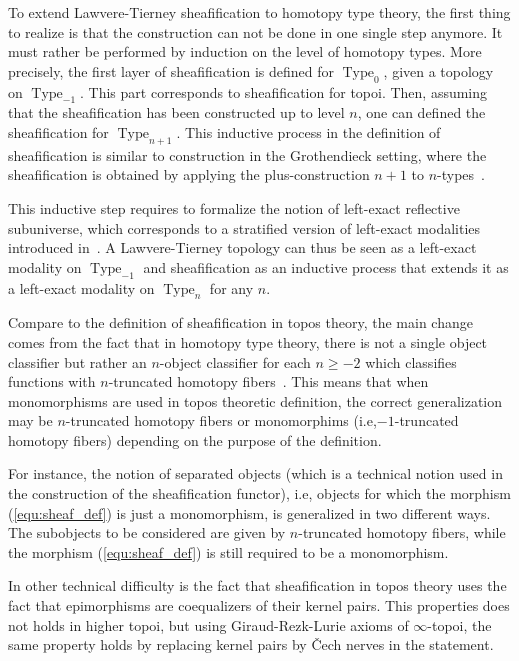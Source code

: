 \documentclass[conference]{IEEEtran}
\newcommand{\ie}{i.e,\xspace}
\DeclareMathOperator{\Type}{Type}
\begin{document}
To extend Lawvere-Tierney sheafification to homotopy type theory, the
first thing to realize is that the construction can not be done in one
single step anymore. It must rather be performed by induction on the
level of homotopy types. More precisely, the first layer of
sheafification is defined for $\Type_{0}$, given a topology on
$\Type_{-1}$. This part corresponds to sheafification for topoi. Then,
assuming that the sheafification has been constructed up to level $n$,
one can defined the sheafification for $\Type_{n+1}$.
%
This inductive process in the definition of sheafification is similar
to construction in the Grothendieck setting, where the
sheafification is obtained by applying the plus-construction $n+1$ to
$n$-types~\cite[Chapter~6]{lurie}.

This inductive step requires to formalize the notion of left-exact
reflective subuniverse, which corresponds to a stratified version of
left-exact modalities introduced in~\cite[Chapter~7]{hottbook}. A
Lawvere-Tierney topology can thus be seen as a left-exact modality on
$\Type_{-1}$ and sheafification as an inductive process that extends
it as a left-exact modality on $\Type_{n}$ for any $n$.

Compare to the definition of sheafification in topos theory, the main
change comes from the fact that in homotopy type theory, there is not
a single object classifier but rather an $n$-object classifier for
each $n\geq -2$ which classifies functions with $n$-truncated homotopy
fibers~\cite{sets_in_hott}. This means that when monomorphisms are used in topos
theoretic definition, the correct generalization may be $n$-truncated homotopy
fibers or monomorphims (\ie $-1$-truncated homotopy
fibers) depending on the purpose of the definition.

For instance, the notion of separated objects (which is a technical
notion used in the construction of the sheafification functor), \ie
objects for which the morphism
(\ref{equ:sheaf_def}) is just a monomorphism, is generalized in two
different ways.  
%
The subobjects to be considered are given by $n$-truncated homotopy fibers,
while the morphism (\ref{equ:sheaf_def}) is still required to be a
monomorphism.

In other technical difficulty is the fact that sheafification in topos
theory uses the fact that epimorphisms are coequalizers of their
kernel pairs. This properties does not holds in higher topoi, but
using Giraud-Rezk-Lurie axioms of $\infty$-topoi, the same property
holds by replacing kernel pairs by \v{C}ech nerves in the statement.
\end{document}
